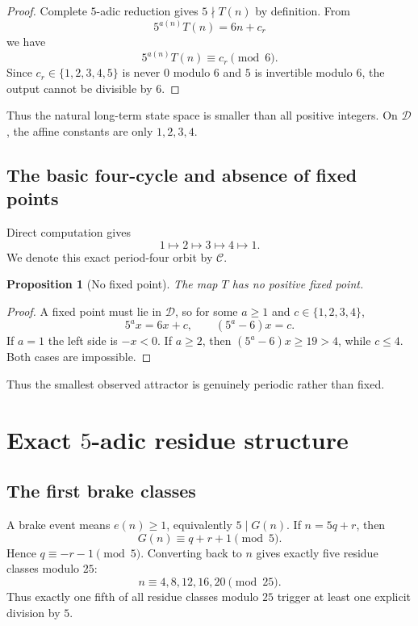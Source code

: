 \documentclass[11pt]{article}
\newtheorem{proposition}[theorem]{Proposition}
\theoremstyle{definition}
\newcommand{\Cyc}{\mathcal{C}}
\newcommand{\D}{\mathcal{D}}
\begin{document}
\begin{proof}
Complete $5$-adic reduction gives $5\nmid T(n)$ by definition. From
\[
5^{a(n)}T(n)=6n+c_r
\]
we have
\[
5^{a(n)}T(n)\equiv c_r\pmod6.
\]
Since $c_r\in\{1,2,3,4,5\}$ is never $0$ modulo $6$ and $5$ is invertible modulo $6$, the output cannot be divisible by $6$.
\end{proof}

Thus the natural long-term state space is smaller than all positive integers. On $\D$, the affine constants are only $1,2,3,4$.

\subsection{The basic four-cycle and absence of fixed points}

Direct computation gives
\begin{equation}
1\longmapsto2\longmapsto3\longmapsto4\longmapsto1.
\label{eq:cycle}
\end{equation}
We denote this exact period-four orbit by $\Cyc$.

\begin{proposition}[No fixed point]
The map $T$ has no positive fixed point.
\end{proposition}

\begin{proof}
A fixed point must lie in $\D$, so for some $a\ge1$ and $c\in\{1,2,3,4\}$,
\[
5^a x=6x+c,
\qquad
(5^a-6)x=c.
\]
If $a=1$ the left side is $-x<0$. If $a\ge2$, then $(5^a-6)x\ge19>4$, while $c\le4$. Both cases are impossible.
\end{proof}

Thus the smallest observed attractor is genuinely periodic rather than fixed.

\section{Exact $5$-adic residue structure}

\subsection{The first brake classes}

A brake event means $e(n)\ge1$, equivalently $5\mid G(n)$. If $n=5q+r$, then
\[
G(n)\equiv q+r+1\pmod5.
\]
Hence $q\equiv-r-1\pmod5$. Converting back to $n$ gives exactly five residue classes modulo $25$:
\begin{equation}
n\equiv4,8,12,16,20\pmod{25}.
\label{eq:brake25}
\end{equation}
Thus exactly one fifth of all residue classes modulo $25$ trigger at least one explicit division by $5$.
\end{document}

